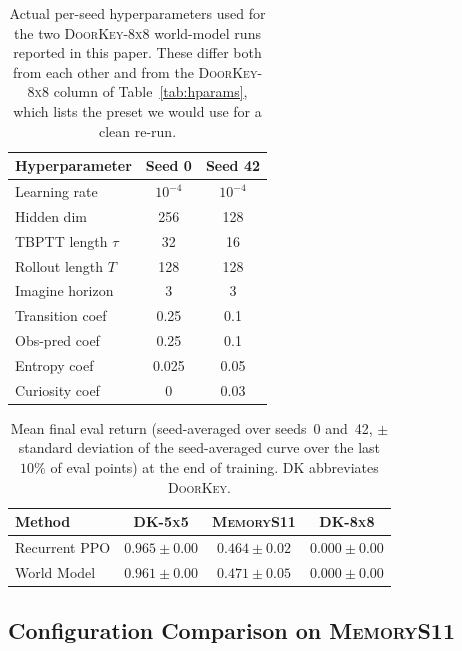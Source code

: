 \documentclass[letterpaper]{article}
\begin{document}
\begin{table}[!tbp]
\centering
\footnotesize
\setlength{\tabcolsep}{4pt}
\begin{tabular}{lcc}
\toprule
Hyperparameter       & Seed 0 & Seed 42 \\
\midrule
Learning rate        & $10^{-4}$ & $10^{-4}$ \\
Hidden dim           & 256       & 128       \\
TBPTT length $\tau$  & 32        & 16        \\
Rollout length $T$   & 128       & 128       \\
Imagine horizon      & 3         & 3         \\
Transition coef      & 0.25      & 0.1       \\
Obs-pred coef        & 0.25      & 0.1       \\
Entropy coef         & 0.025     & 0.05      \\
Curiosity coef       & 0         & 0.03      \\
\bottomrule
\end{tabular}
\caption{Actual per-seed hyperparameters used for the two
\textsc{DoorKey-8x8} world-model runs reported in this paper. These
differ both from each other and from the \textsc{DoorKey-8x8} column of
Table~\ref{tab:hparams}, which lists the preset we would use for a clean
re-run.}
\label{tab:doorkey8_configs}
\end{table}

\begin{table}[!tbp]
\centering
\footnotesize
\setlength{\tabcolsep}{3pt}
\begin{tabular}{lccc}
\toprule
Method & \textsc{DK-5x5} & \textsc{MemoryS11} & \textsc{DK-8x8} \\
\midrule
Recurrent PPO  & $0.965\!\pm\!0.00$ & $0.464\!\pm\!0.02$ & $0.000\!\pm\!0.00$ \\
World Model    & $0.961\!\pm\!0.00$ & $0.471\!\pm\!0.05$ & $0.000\!\pm\!0.00$ \\
\bottomrule
\end{tabular}
\caption{Mean final eval return (seed-averaged over seeds~0 and~42,
$\pm$ standard deviation of the seed-averaged curve over the last $10\%$
of eval points) at the end of training. \textsc{DK} abbreviates
\textsc{DoorKey}.}
\label{tab:final}
\end{table}

\subsection{Configuration Comparison on \textsc{MemoryS11}}
\label{sec:ablation}
\end{document}
